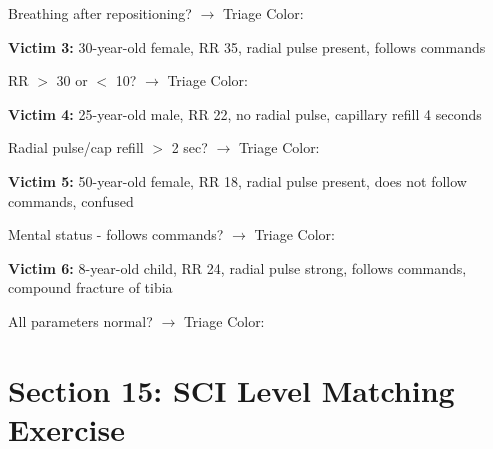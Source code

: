 \documentclass[11pt]{article}
\begin{document}
\hspace{1cm} Breathing after repositioning? \underline{\hspace{2cm}} $\rightarrow$ Triage Color: \underline{\hspace{3cm}}

\vspace{0.5cm}

\textbf{Victim 3:} 30-year-old female, RR 35, radial pulse present, follows commands

\hspace{1cm} RR $>$ 30 or $<$ 10? \underline{\hspace{2cm}} $\rightarrow$ Triage Color: \underline{\hspace{3cm}}

\vspace{0.5cm}

\textbf{Victim 4:} 25-year-old male, RR 22, no radial pulse, capillary refill 4 seconds

\hspace{1cm} Radial pulse/cap refill $>$ 2 sec? \underline{\hspace{2cm}} $\rightarrow$ Triage Color: \underline{\hspace{3cm}}

\vspace{0.5cm}

\textbf{Victim 5:} 50-year-old female, RR 18, radial pulse present, does not follow commands, confused

\hspace{1cm} Mental status - follows commands? \underline{\hspace{2cm}} $\rightarrow$ Triage Color: \underline{\hspace{3cm}}

\vspace{0.5cm}

\textbf{Victim 6:} 8-year-old child, RR 24, radial pulse strong, follows commands, compound fracture of tibia

\hspace{1cm} All parameters normal? \underline{\hspace{2cm}} $\rightarrow$ Triage Color: \underline{\hspace{3cm}}

\vspace{1cm}

\section*{Section 15: SCI Level Matching Exercise}
\end{document}
